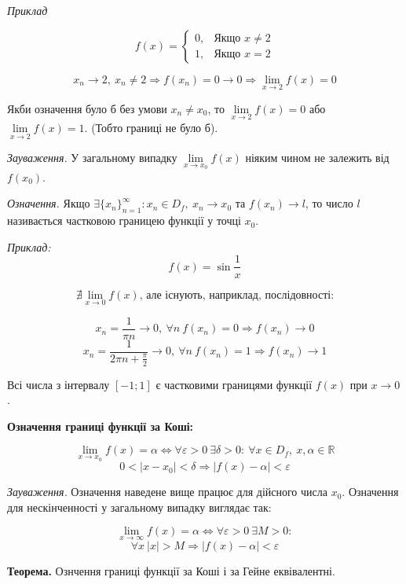 \documentclass[12pt]{report}
\begin{document}
\textit{Приклад}

$$f(x) = \begin{cases}0, &\textrm{Якщо $x \neq 2$}  
\\ 1, &\textrm{Якщо $x = 2$} \end{cases}$$

$$x_n \to 2,\ x_n \neq 2 \Rightarrow f(x_n) = 0 \to 0 \Rightarrow \lim_{x \to 2}f(x) = 0$$

Якби означення було б без умови $x_n \neq x_0$, то $\lim\limits_{x \to 2}f(x) = 0$ або $\lim\limits_{x \to 2}f(x) = 1$. (Тобто границі не було б).

\vspace{3mm}

\textit{Зауваження.} У загальному випадку $\lim\limits_{x \to x_0}f(x)$ ніяким чином не залежить від $f(x_0)$.

\vspace{5mm}

\textit{Означення.} Якщо $\exists \{ x_n \}_{n=1}^{\infty} : x_n \in D_f,\ x_n \to x_0$ та $f(x_n) \to l$, то число $l$ називається частковою границею функції у точці $x_0$.

\textit{Приклад:}
$$f(x) = \sin \frac{1}{x}$$

$$\nexists \lim_{x \to 0} f(x) \textrm{, але існують, наприклад, послідовності:}$$

$$x_n = \frac{1}{\pi n} \to 0,\ \forall n \ f(x_n) = 0  \Rightarrow f(x_n) \to 0$$
$$x_n = \frac{1}{2\pi  n + \frac{\pi}{2}} \to 0,\ \forall n \ f(x_n) = 1  \Rightarrow f(x_n) \to 1$$

Всі числа з інтервалу $[-1;1]$ є частковими границями функції $f(x)$ при $x \to 0$.

\textbf{Означення границі функції за Коші:}

$$\lim_{x \to x_0} f(x) = \alpha \Longleftrightarrow \forall \varepsilon > 0 \ \exists \delta > 0 : \ \forall x \in D_f,\ x, \alpha \in \mathbb{R}$$
$$ 0 < |x - x_0| < \delta \Longrightarrow |f(x) - \alpha| < \varepsilon$$

\textit{Зауваження.} Означення наведене вище працює для дійсного числа $x_0$. Означення для нескінченності у загальному випадку виглядає так:

$$\lim_{x \to \infty} f(x) = \alpha \Longleftrightarrow \forall \varepsilon > 0  \ \exists M > 0 : $$
$$\forall x \ |x| > M \Longrightarrow |f(x) - \alpha| < \varepsilon$$

\textbf{Теорема.} Ознчення границі функції за Коші і за Гейне еквівалентні.
\end{document}
